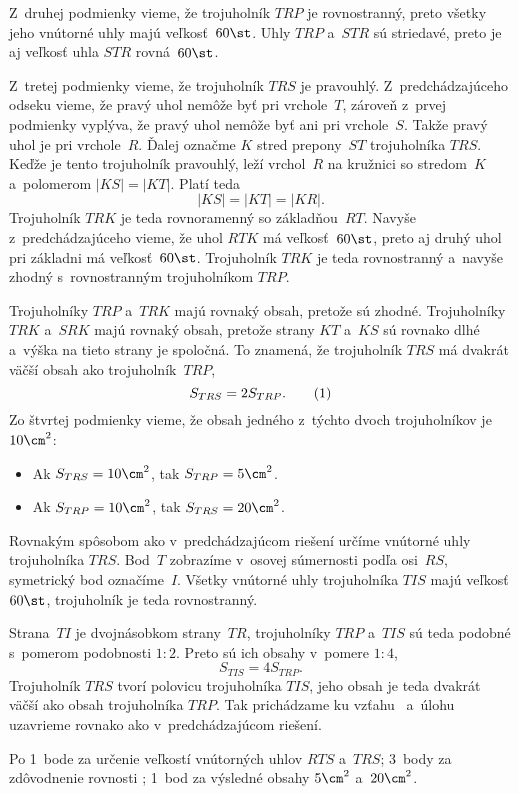 {%
Z~druhej podmienky vieme, že trojuholník $TRP$ je rovnostranný,
preto všetky jeho vnútorné uhly majú veľkosť~$60\st$.
Uhly $TRP$ a~$STR$ sú striedavé, preto je aj veľkosť uhla $STR$ rovná~$60\st$.

Z~tretej podmienky vieme, že trojuholník $TRS$ je pravouhlý.
Z~predchádzajúceho odseku vieme, že pravý uhol nemôže byť pri vrchole~$T$,
zároveň z~prvej podmienky vyplýva, že pravý uhol nemôže byť ani pri vrchole~$S$.
Takže pravý uhol je pri vrchole~$R$.
Ďalej označme $K$ stred prepony~$ST$ trojuholníka $TRS$.
Keďže je tento trojuholník pravouhlý, leží vrchol~$R$ na kružnici so
stredom~$K$ a~polomerom $|KS|=|KT|$.
Platí teda
$$
|KS|=|KT|=|KR|.
$$
Trojuholník $TRK$ je teda rovnoramenný so základňou~$RT$.
Navyše z~predchádzajúceho vieme, že uhol $RTK$ má veľkosť~$60\st$,
preto aj druhý uhol pri základni má veľkosť~$60\st$.
Trojuholník $TRK$ je teda rovnostranný a~navyše zhodný s~rovnostranným
trojuholníkom $TRP$.
%

Trojuholníky $TRP$ a~$TRK$ majú rovnaký obsah, pretože sú zhodné.
Trojuholníky $TRK$ a~$SRK$ majú rovnaký obsah, pretože strany $KT$ a~$KS$
sú rovnako dlhé a~výška na tieto strany je spoločná.
To znamená, že trojuholník $TRS$ má dvakrát väčší obsah ako trojuholník~$TRP$,
$$
S_{TRS}=2S_{TRP}. \tag1
$$
Zo štvrtej podmienky vieme, že obsah jedného z~týchto dvoch trojuholníkov je
$10\cm^2$:
\begin{itemize}
\item Ak $S_{TRS}=10\cm^2$, tak $S_{TRP}=5\cm^2$.
\item Ak $S_{TRP}=10\cm^2$, tak $S_{TRS}=20\cm^2$.
\end{itemize}

\ineriesenie
Rovnakým spôsobom ako v~predchádzajúcom riešení určíme vnútorné uhly trojuholníka $TRS$.
Bod~$T$ zobrazíme v~osovej súmernosti podľa osi~$RS$, symetrický bod
označíme~$I$.
Všetky vnútorné uhly trojuholníka $TIS$ majú veľkosť $60\st$, trojuholník je
teda rovnostranný.
%

Strana~$TI$ je dvojnásobkom strany~$TR$, trojuholníky
$TRP$ a~$TIS$ sú teda podobné s~pomerom podobnosti $1:2$.
Preto sú ich obsahy v~pomere $1:4$,
$$
S_{TIS}=4S_{TRP}.
$$
Trojuholník $TRS$ tvorí polovicu trojuholníka $TIS$,
jeho obsah je teda dvakrát väčší ako obsah trojuholníka $TRP$.
Tak prichádzame ku vzťahu~ a~úlohu uzavrieme rovnako ako v~predchádzajúcom
riešení.


\hodnotenie
Po 1~bode za určenie veľkostí vnútorných uhlov $RTS$ a~$TRS$;
3~body za zdôvodnenie rovnosti ;
1~bod za výsledné obsahy $5\cm^2$ a~$20\cm^2$.
\endhodnotenie
}


